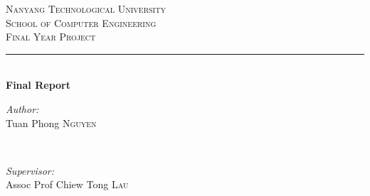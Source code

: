\begin{titlepage}

\newcommand{\HRule}{\rule{\linewidth}{0.5mm}} %

\center %
 

\textsc{\LARGE Nanyang Technological University}\\[1.5cm] %
\textsc{\Large School of Computer Engineering}\\[0.5cm] %
\textsc{\large Final Year Project}\\[0.5cm] %


\HRule \\[0.4cm] { \huge \bfseries Final Report}\\[0.4cm] %
 

\begin{minipage}{0.4\textwidth}
    \begin{flushleft}
        \large \emph{Author:}\\ Tuan Phong
        \textsc{Nguyen} %
    \end{flushleft}
\end{minipage} ~
\begin{minipage}{0.4\textwidth}
    \begin{flushright}
        \large \emph{Supervisor:} \\ Assoc Prof Chiew Tong
        \textsc{Lau} %
    \end{flushright}
\end{minipage}


\end{titlepage}
